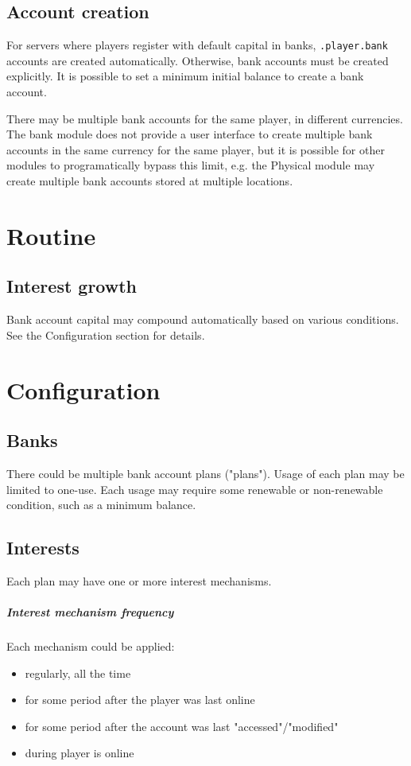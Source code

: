 \documentclass{report}
\begin{document}
		\section{Account creation}
			For servers where players register with default capital in banks,
			\texttt{.player.bank} accounts are created automatically.
			Otherwise, bank accounts must be created explicitly.
			It is possible to set a minimum initial balance to create a bank account.

			There may be multiple bank accounts for the same player, in different currencies.
			The bank module does not provide a user interface to create
			multiple bank accounts in the same currency for the same player,
			but it is possible for other modules to programatically bypass this limit,
			e.g. the Physical module may create multiple bank accounts stored at multiple locations.

		\chapter{Routine}
			\section{Interest growth}
				Bank account capital may compound automatically based on various conditions. See the Configuration section for details.

		\chapter{Configuration}
			\section{Banks}
				There could be multiple bank account plans ("plans").
				Usage of each plan may be limited to one-use.
				Each usage may require some renewable or non-renewable condition, such as a minimum balance.

			\section{Interests}
				Each plan may have one or more interest mechanisms.

				\paragraph{Interest mechanism frequency} Each mechanism could be applied:
				\begin{itemize}
					\item regularly, all the time
					\item for some period after the player was last online
					\item for some period after the account was last "accessed"/"modified"
					\item during player is online
				\end{itemize}
\end{document}
